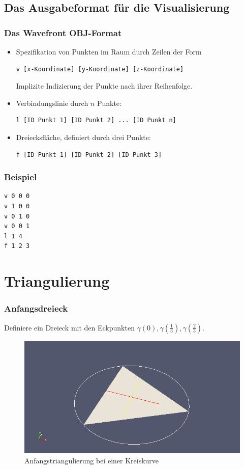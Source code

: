 \documentclass{beamer}
\begin{document}
\subsection{Das Ausgabeformat für die Visualisierung}

\begin{frame}[fragile]
	\frametitle{Das Wavefront OBJ-Format}
	\begin{itemize}
		\item
			Spezifikation von Punkten im Raum durch Zeilen der Form
			\begin{verbatim}
v [x-Koordinate] [y-Koordinate] [z-Koordinate]
			\end{verbatim}
			Implizite Indizierung der Punkte nach ihrer Reihenfolge.
		\item
			Verbindungslinie durch $n$ Punkte:
			\begin{verbatim}
l [ID Punkt 1] [ID Punkt 2] ... [ID Punkt n]
			\end{verbatim}
		\item
			Dreiecksfläche, definiert durch drei Punkte:
			\begin{verbatim}
f [ID Punkt 1] [ID Punkt 2] [ID Punkt 3]
			\end{verbatim}
	\end{itemize}
\end{frame}

\begin{frame}[fragile]
	\frametitle{Beispiel}
	\begin{verbatim}
v 0 0 0
v 1 0 0
v 0 1 0
v 0 0 1
l 1 4
f 1 2 3
	\end{verbatim}
\end{frame}


\section{Triangulierung}

\begin{frame}
	\frametitle{Anfangsdreieck}

	Definiere ein Dreieck mit den Eckpunkten $\gamma(0), \gamma(\frac 13), \gamma(\frac 23)$.
	\begin{figure}
		\caption{Anfangstriangulierung bei einer Kreiskurve}
		\includegraphics[width=0.8 \linewidth]{kreis0.png}
	\end{figure}
\end{frame}
\end{document}
